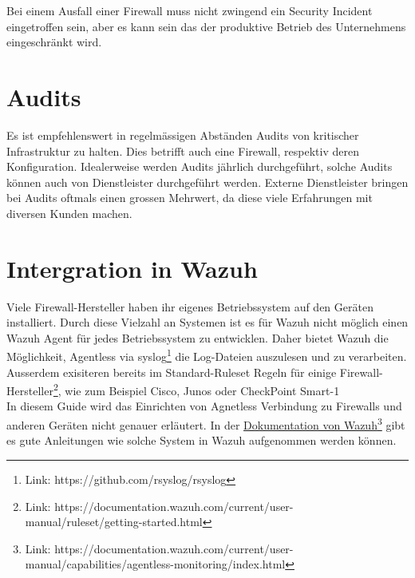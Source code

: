 Bei einem Ausfall einer Firewall muss nicht zwingend ein Security Incident eingetroffen sein, aber es kann sein das der produktive Betrieb des Unternehmens eingeschränkt wird.


\section{Audits}
Es ist empfehlenswert in regelmässigen Abständen Audits von kritischer Infrastruktur zu halten.
Dies betrifft auch eine Firewall, respektiv deren Konfiguration.
Idealerweise werden Audits jährlich durchgeführt, solche Audits können auch von Dienstleister durchgeführt werden.
Externe Dienstleister bringen bei Audits oftmals einen grossen Mehrwert, da diese viele Erfahrungen mit diversen Kunden machen.

\section{Intergration in Wazuh}
Viele Firewall-Hersteller haben ihr eigenes Betriebssystem auf den Geräten installiert.
Durch diese Vielzahl an Systemen ist es für Wazuh nicht möglich einen Wazuh Agent für jedes Betriebssystem zu entwicklen.
Daher bietet Wazuh die Möglichkeit, Agentless via syslog\footnote{Link: https://github.com/rsyslog/rsyslog} die Log-Dateien auszulesen und zu verarbeiten.\\

Ausserdem exisiteren bereits im Standard-Ruleset Regeln für einige Firewall-Hersteller\footnote{Link: https://documentation.wazuh.com/current/user-manual/ruleset/getting-started.html}, wie zum Beispiel Cisco, Junos oder CheckPoint Smart-1\\

In diesem Guide wird das Einrichten von Agnetless Verbindung zu Firewalls und anderen Geräten nicht genauer erläutert.
In der \href{https://documentation.wazuh.com/current/user-manual/capabilities/agentless-monitoring/index.html}{Dokumentation von Wazuh}\footnote{Link: https://documentation.wazuh.com/current/user-manual/capabilities/agentless-monitoring/index.html} gibt es gute Anleitungen wie solche System in Wazuh aufgenommen werden können.